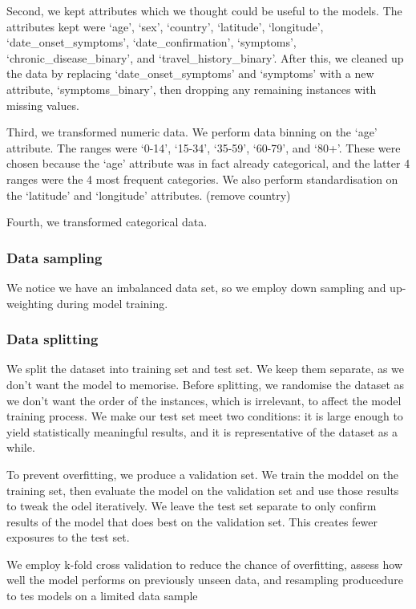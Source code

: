 \documentclass[twoside,11pt]{article}
\begin{document}
Second, we kept attributes which we thought could be useful to the models. The attributes kept were `age', `sex', `country', `latitude', `longitude', `date\_onset\_symptoms', `date\_confirmation', `symptoms', `chronic\_disease\_binary', and `travel\_history\_binary'. After this, we cleaned up the data by replacing `date\_onset\_symptoms' and `symptoms' with a new attribute, `symptoms\_binary', then dropping any remaining instances with missing values. 

Third, we transformed numeric data. We perform data binning on the `age' attribute. The ranges were `0-14', `15-34', `35-59', `60-79', and `80+'. These were chosen because the `age' attribute was in fact already categorical, and the latter 4 ranges were the 4 most frequent categories. We also perform standardisation on the `latitude' and `longitude' attributes. (remove country)

Fourth, we transformed categorical data.

\subsubsection{Data sampling}

We notice we have an imbalanced data set, so we employ down sampling and up-weighting during model training.

\subsubsection{Data splitting}
We split the dataset into training set and test set. We keep them separate, as we don't want the model to memorise. Before splitting, we randomise the dataset as we don't want the order of the instances, which is irrelevant, to affect the model training process. We make our test set meet two conditions: it is large enough to yield statistically meaningful results, and it is representative of the dataset as a while.

To prevent overfitting, we produce a validation set. We train the moddel on the training set, then evaluate the model on the validation set and use those results to tweak the odel iteratively. We leave the test set separate to only confirm results of the model that does best on the validation set. This creates fewer exposures to the test set.

We employ k-fold cross validation to reduce the chance of overfitting, assess how well the model performs on previously unseen data, and resampling producedure to tes models on a limited data sample
\end{document}
